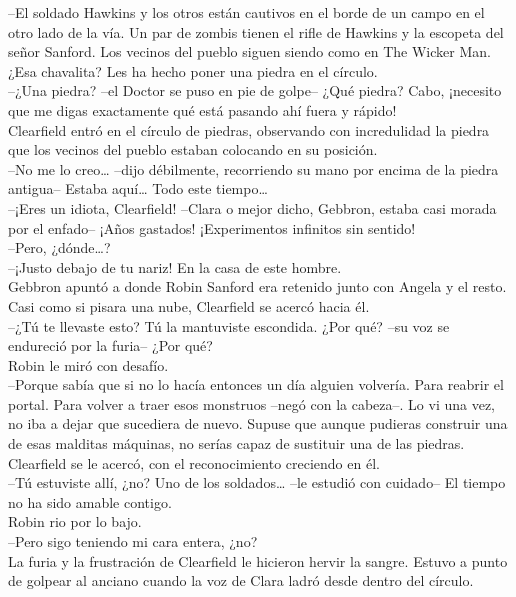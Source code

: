 --El soldado Hawkins y los otros están cautivos en el borde de un campo
en el otro lado de la vía. Un par de zombis tienen el rifle de Hawkins y
la escopeta del señor Sanford. Los vecinos del pueblo siguen siendo como
en The Wicker Man. ¿Esa chavalita? Les ha hecho poner una piedra en el
círculo.\\
--¿Una piedra? --el Doctor se puso en pie de golpe-- ¿Qué piedra? Cabo,
¡necesito que me digas exactamente qué está pasando ahí fuera y
rápido!\\[2\baselineskip]Clearfield entró en el círculo de piedras,
observando con incredulidad la piedra que los vecinos del pueblo estaban
colocando en su posición.\\
--No me lo creo\ldots{} --dijo débilmente, recorriendo su mano por
encima de la piedra antigua-- Estaba aquí\ldots{} Todo este
tiempo\ldots{}\\
--¡Eres un idiota, Clearfield! --Clara o mejor dicho, Gebbron, estaba
casi morada por el enfado-- ¡Años gastados! ¡Experimentos infinitos sin
sentido!\\
--Pero, ¿dónde\ldots{}?\\
--¡Justo debajo de tu nariz! En la casa de este hombre.\\
Gebbron apuntó a donde Robin Sanford era retenido junto con Angela y el
resto. Casi como si pisara una nube, Clearfield se acercó hacia él.\\
--¿Tú te llevaste esto? Tú la mantuviste escondida. ¿Por qué? --su voz
se endureció por la furia-- ¿Por qué?\\
Robin le miró con desafío.\\
--Porque sabía que si no lo hacía entonces un día alguien volvería. Para
reabrir el portal. Para volver a traer esos monstruos --negó con la
cabeza--. Lo vi una vez, no iba a dejar que sucediera de nuevo. Supuse
que aunque pudieras construir una de esas malditas máquinas, no serías
capaz de sustituir una de las piedras.\\
Clearfield se le acercó, con el reconocimiento creciendo en él.\\
--Tú estuviste allí, ¿no? Uno de los soldados\ldots{} --le estudió con
cuidado-- El tiempo no ha sido amable contigo.\\
Robin rio por lo bajo.\\
--Pero sigo teniendo mi cara entera, ¿no?\\
La furia y la frustración de Clearfield le hicieron hervir la sangre.
Estuvo a punto de golpear al anciano cuando la voz de Clara ladró desde
dentro del círculo.\\
